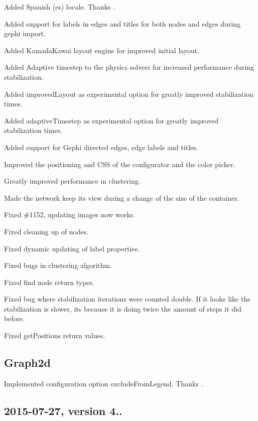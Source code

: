 \begin{DoxyItemize}
\item Added Spanish (es) locale. Thanks .
\item Added support for labels in edges and titles for both nodes and edges during gephi import.
\item Added Kamada\+Kawai layout engine for improved initial layout.
\item Added Adaptive timestep to the physics solvers for increased performance during stabilization.
\item Added improved\+Layout as experimental option for greatly improved stabilization times.
\item Added adaptive\+Timestep as experimental option for greatly improved stabilization times.
\item Added support for Gephi directed edges, edge labels and titles.
\item Improved the positioning and C\+SS of the configurator and the color picker.
\item Greatly improved performance in clustering.
\item Made the network keep its \textquotesingle{}view\textquotesingle{} during a change of the size of the container.
\item Fixed \#1152, updating images now works.
\item Fixed cleaning up of nodes.
\item Fixed dynamic updating of label properties.
\item Fixed bugs in clustering algorithm.
\item Fixed find node return types.
\item Fixed bug where stabilization iterations were counted double. If it looks like the stabilization is slower, its because it is doing twice the amount of steps it did before.
\item Fixed get\+Positions return values.
\end{DoxyItemize}

\subsection*{Graph2d}


\begin{DoxyItemize}
\item Implemented configuration option {\ttfamily exclude\+From\+Legend}. Thanks .
\end{DoxyItemize}

\subsection*{2015-\/07-\/27, version 4..}

